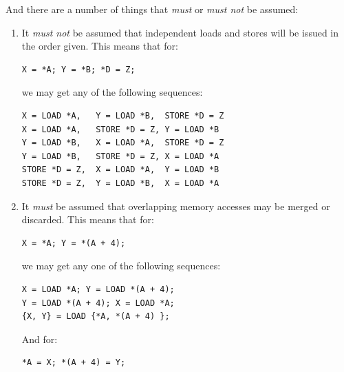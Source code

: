 And there are a number of things that \emph{must} or \emph{must not} be assumed:

\begin{enumerate}
\item	It \emph{must not} be assumed that independent loads and stores will
	be issued in the order given.  This means that for:

\begin{minipage}[t]{\columnwidth}
\scriptsize
\begin{verbatim}
X = *A; Y = *B; *D = Z;
\end{verbatim}
\end{minipage}

	we may get any of the following sequences:

\begin{minipage}[t]{\columnwidth}
\scriptsize
\begin{verbatim}
X = LOAD *A,   Y = LOAD *B,  STORE *D = Z
X = LOAD *A,   STORE *D = Z, Y = LOAD *B
Y = LOAD *B,   X = LOAD *A,  STORE *D = Z
Y = LOAD *B,   STORE *D = Z, X = LOAD *A
STORE *D = Z,  X = LOAD *A,  Y = LOAD *B
STORE *D = Z,  Y = LOAD *B,  X = LOAD *A
\end{verbatim}
\end{minipage}

\item	It \emph{must} be assumed that overlapping memory accesses may
	be merged or discarded.  This means that for:

\begin{minipage}[t]{\columnwidth}
\scriptsize
\begin{verbatim}
X = *A; Y = *(A + 4);
\end{verbatim}
\end{minipage}

	we may get any one of the following sequences:

\begin{minipage}[t]{\columnwidth}
\scriptsize
\begin{verbatim}
X = LOAD *A; Y = LOAD *(A + 4);
Y = LOAD *(A + 4); X = LOAD *A;
{X, Y} = LOAD {*A, *(A + 4) };
\end{verbatim}
\vspace{1pt}
\end{minipage}

	And for:

\begin{minipage}[t]{\columnwidth}
\scriptsize
\begin{verbatim}
*A = X; *(A + 4) = Y;
\end{verbatim}
\end{minipage}


\end{enumerate}
